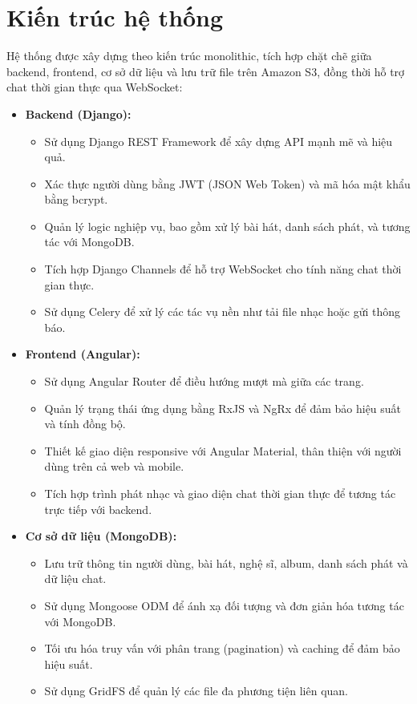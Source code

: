 \documentclass[a4paper,12pt]{report}
\begin{document}
\section{Kiến trúc hệ thống}
Hệ thống được xây dựng theo kiến trúc monolithic, tích hợp chặt chẽ giữa backend, frontend, cơ sở dữ liệu và lưu trữ file trên Amazon S3, đồng thời hỗ trợ chat thời gian thực qua WebSocket:

\begin{itemize}
    \item \textbf{Backend (Django):}
        \begin{itemize}
            \item Sử dụng Django REST Framework để xây dựng API mạnh mẽ và hiệu quả.
            \item Xác thực người dùng bằng JWT (JSON Web Token) và mã hóa mật khẩu bằng bcrypt.
            \item Quản lý logic nghiệp vụ, bao gồm xử lý bài hát, danh sách phát, và tương tác với MongoDB.
            \item Tích hợp Django Channels để hỗ trợ WebSocket cho tính năng chat thời gian thực.
            \item Sử dụng Celery để xử lý các tác vụ nền như tải file nhạc hoặc gửi thông báo.
        \end{itemize}

    \item \textbf{Frontend (Angular):}
        \begin{itemize}
            \item Sử dụng Angular Router để điều hướng mượt mà giữa các trang.
            \item Quản lý trạng thái ứng dụng bằng RxJS và NgRx để đảm bảo hiệu suất và tính đồng bộ.
            \item Thiết kế giao diện responsive với Angular Material, thân thiện với người dùng trên cả web và mobile.
            \item Tích hợp trình phát nhạc và giao diện chat thời gian thực để tương tác trực tiếp với backend.
        \end{itemize}

    \item \textbf{Cơ sở dữ liệu (MongoDB):}
        \begin{itemize}
            \item Lưu trữ thông tin người dùng, bài hát, nghệ sĩ, album, danh sách phát và dữ liệu chat.
            \item Sử dụng Mongoose ODM để ánh xạ đối tượng và đơn giản hóa tương tác với MongoDB.
            \item Tối ưu hóa truy vấn với phân trang (pagination) và caching để đảm bảo hiệu suất.
            \item Sử dụng GridFS để quản lý các file đa phương tiện liên quan.
        \end{itemize}


\end{itemize}
\end{document}
